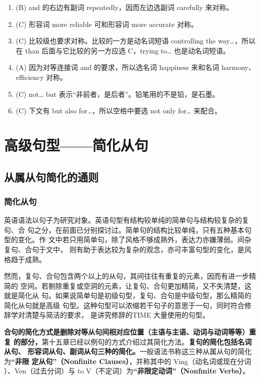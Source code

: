 \begin{enumerate}
\item (B) and 的右边有副词 repeatedly，因而左边选副词 carefully 来对称。

\item(C) 形容词 more reliable 可和形容词 more accurate 对称。

\item (C) 比较级也要求对称。比较的一方是动名词短语 controlling the way…，所以在 than 后面与它比较的另一方应选 C，trying to… 也是动名词短语。
\item (A) 因为对等连接词 and 的要求，所以选名词 happiness 来和名词 harmony、efficiency 对称。

\item  (C) not… but 表示“非前者，是后者”。铅笔用的不是铅，是石墨。

\item (C) 下文有 but also for…，所以空格中要选 not only for… 来配合。
\end{enumerate}


\part{高级句型——简化从句}

\chapter{从属从句简化的通则}

\section{简化从句}

英语语法以句子为研究对象。英语句型有结构较单纯的简单句与结构较复杂的复句、合
句之分，在前面已分别探讨过。简单句的结构比较单纯，只有五种基本句型的变化。作
文中若只用简单句，除了风格不够成熟外，表达力亦嫌薄弱。间杂复句、合句于文中，
则有助于表达较为复杂的观念，亦可丰富句型的变化，是风格趋于成熟。

然而，复句、合句包含两个以上的从句，其间往往有重复的元素，因而有进一步精简的
空间。若剔除重复或空洞的元素，让复句、合句更加精简，又不失清楚，这就是简化从
句。如果说简单句是初级句型，复句、合句是中级句型，那么精简的简化从句就是高级
句型。这种句型可以浓缩若干句子的意思于一句，同时符合修辞学对清楚与简洁的要求，
是讲究修辞的TIME 大量使用的句型。

\textbf{合句的简化方式是删除对等从句间相对应位置（主语与主语、动词与动词等等）重复
  的部分，}第十五章已经以例句的方式介绍过其简化方法。\textbf{复句的简化包括名词从句、
  形容词从句、副词从句三种的简化。}一般语法书称这三种从属从句的简化为\textbf{“非限
  定从句”（Nonfinite Clauses）}，并称其中的 Ving（动名词或现在分词
）、Ven（过去分词）与 to V（不定词）为\textbf{“非限定动词”（Nonfmite Verbs）}。

